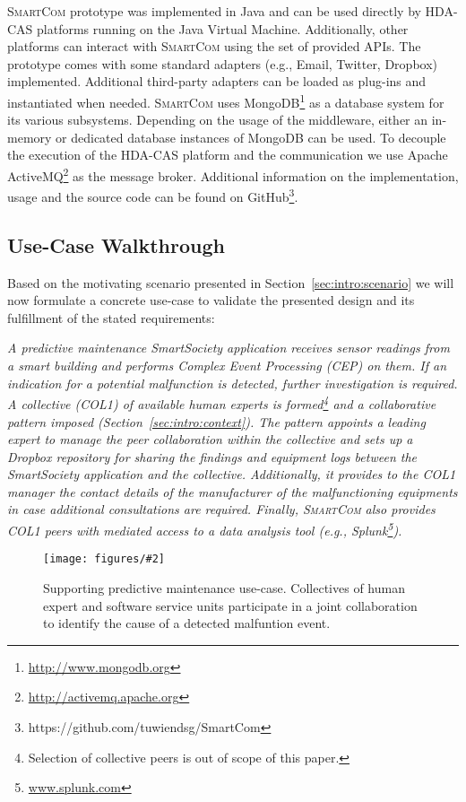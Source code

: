 \documentclass{llncs}
\newcommand{\mdl}{\textsc{SmartCom}}
\newcommand{\figcol}[3][0.9]{
\begin{figure}[H] %
\centering
\texttt{[image: figures/\#2]}
\caption{#3}
\label{fig:#2}
\end{figure}
}
\begin{document}
  
  \mdl{} prototype
  was implemented in Java and can be used directly by HDA-CAS platforms running on the Java Virtual Machine. Additionally, other platforms can interact with \mdl{} using the set of provided APIs\footnotemark. 
  The prototype comes with some standard adapters (e.g., Email, Twitter, Dropbox) implemented. 
  Additional third-party adapters can be loaded as plug-ins and instantiated when needed.
  \mdl{} uses MongoDB\footnote{\url{http://www.mongodb.org}} as a database system for its various subsystems. Depending on the usage of the middleware, either an in-memory or dedicated database instances of MongoDB can be used. To decouple the execution of the HDA-CAS platform and the communication we use Apache ActiveMQ\footnote{\url{http://activemq.apache.org}} as the message broker.
  Additional information on the implementation, usage and the source code can be found on GitHub\footnote{https://github.com/tuwiendsg/SmartCom}. 



  \subsection{Use-Case Walkthrough}

    Based on the motivating scenario presented in Section~\ref{sec:intro:scenario} we will now formulate a concrete use-case to validate the presented design and its fulfillment of the stated requirements:

    \emph{A predictive maintenance SmartSociety application receives sensor readings from a smart building and performs Complex Event Processing (CEP) on them. If an indication for a potential malfunction is detected, further investigation is required. A collective (COL1) of available human experts is formed\footnote{Selection of collective peers is out of scope of this paper.} and a collaborative pattern imposed (Section~\ref{sec:intro:context}). The pattern appoints a leading expert to manage the peer collaboration within the collective and sets up a Dropbox repository for sharing the findings and equipment logs between the SmartSociety application and the collective. Additionally, it provides to the COL1 manager the contact details of the manufacturer of the malfunctioning equipments in case additional consultations are required. Finally, \mdl{} also provides COL1 peers with mediated access to a data analysis tool (e.g., Splunk\footnote{\url{www.splunk.com}}).
    }

    \figcol[1.0]{use-case}{
    Supporting predictive maintenance use-case. Collectives of human expert and software service units participate in a joint collaboration to identify the cause of a detected malfuntion event.}
    
\end{document}
